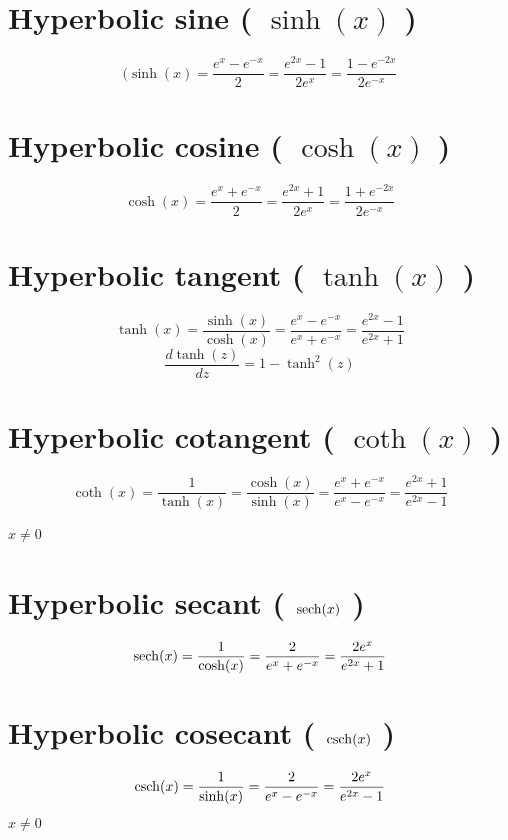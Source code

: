 \section{Hyperbolic sine ( $\sinh(x)$ ) }\label{Hyperbolic sine (sinh)}
\[
    (\sinh(x) = {\displaystyle\dfrac{e^{x} - e^{-x}}{2}}={\displaystyle\dfrac{e^{2x} - 1}{2e^{x}}}={\displaystyle\dfrac{1 - e^{-2x}}{2e^{-x}}}
\]

\section{Hyperbolic cosine ( $\cosh(x)$ ) }\label{Hyperbolic cosine (cosh)}
\[
    \cosh(x) = {\displaystyle\dfrac{e^{x} + e^{-x}}{2}} = {\displaystyle\dfrac{e^{2x} + 1}{2e^{x}}} = {\displaystyle\dfrac{1 + e^{-2x}}{2e^{-x}}}
\]

\section{Hyperbolic tangent ( $\tanh(x)$ ) \cite{wiki-Sigmoid_function,wiki-Hyperbolic_functions, dnn-1}}\label{Hyperbolic tangent (tanh)}
\[
    \tanh(x) = \displaystyle\dfrac{\sinh(x)}{\cosh(x)} = \displaystyle\dfrac{e^{x} - e^{-x}}{e^{x} + e^{-x}} = \displaystyle\dfrac{e^{2x} - 1}{e^{2x} + 1}
\]
\[
    \dfrac{d\tanh(z)}{dz} = 1-\tanh^2(z)
\]


\section{Hyperbolic cotangent ( $\coth(x)$ )}\label{Hyperbolic cotangent (coth)}
\[
    \coth(x) = \displaystyle\dfrac{1}{\tanh(x)} = \displaystyle\dfrac{\cosh(x)}{\sinh(x)} = \displaystyle\dfrac{e^{x} + e^{-x}}{e^{x} - e^{-x}} = \displaystyle\dfrac{e^{2x} + 1}{e^{2x} - 1}
\]

$x \neq 0$

\section{Hyperbolic secant ( $\operatorname{sech}(x)$ )} \label{Hyperbolic secant (sech)}
\[
    \operatorname{sech}(x) = \displaystyle\dfrac{1}{\cosh(x)} = \displaystyle\dfrac{2}{e^{x} + e^{-x}} = \displaystyle\dfrac{2e^{x}}{e^{2x} + 1}
\]

\section{Hyperbolic cosecant ( $\operatorname{csch}(x)$ )}\label{Hyperbolic cosecant (csch)}
\[
    \operatorname{csch}(x) = \displaystyle\dfrac{1}{\sinh(x)} = \displaystyle\dfrac{2}{e^{x} - e^{-x}} = \displaystyle\dfrac{2e^{x}}{e^{2x} - 1}
\]
$x \neq 0$

